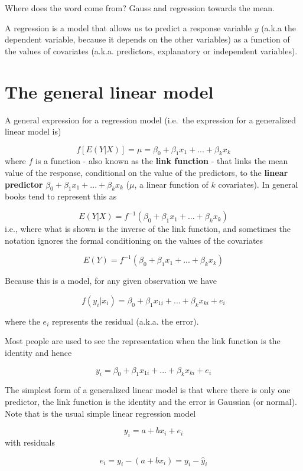 \documentclass[
]{book}
\begin{document}
Where does the word come from? Gauss and regression towards the mean.

A regression is a model that allows us to predict a response variable \(y\) (a.k.a the dependent variable, because it depends on the other variables) as a function of the values of covariates (a.k.a. predictors, explanatory or independent variables).

\hypertarget{the-general-linear-model}{%
\section{The general linear model}\label{the-general-linear-model}}

A general expression for a regression model (i.e.~the expression for a generalized linear model is)

\[ f[E(Y|X)] = \mu = \beta_0+\beta_1 x_1 + ... + \beta_k x_k \]
where \(f\) is a function - also known as the \textbf{link function} - that links the mean value of the response, conditional on the value of the predictors, to the \textbf{linear predictor} \(\beta_0+\beta_1 x_1 + ... + \beta_k x_k\) (\(\mu\), a linear function of \(k\) covariates). In general books tend to represent this as

\[ E(Y|X) =  f^{-1}(\beta_0+\beta_1 x_1 + ... + \beta_k x_k) \]
i.e., where what is shown is the inverse of the link function,
and sometimes the notation ignores the formal conditioning on the values of the covariates

\[ E(Y) =  f^{-1}(\beta_0+\beta_1 x_1 + ... + \beta_k x_k) \]

Because this is a model, for any given observation we have

\[ f{(y_i|x_i)} =  \beta_0+\beta_1 x_{1i} + ... + \beta_k x_{ki} + e_i \]

where the \(e_i\) represents the residual (a.k.a. the error).

Most people are used to see the representation when the link function is the identity and hence

\[ y_i =  \beta_0+\beta_1 x_{1i} + ... + \beta_k x_{ki} + e_i \]

The simplest form of a generalized linear model is that where there is only one predictor, the link function is the identity and the error is Gaussian (or normal). Note that is the usual simple linear regression model

\[y_i=a+bx_i+e_i\]
with residuals

\[e_i=y_i - (a+bx_i)= y_i-\hat y_i\]
\end{document}
